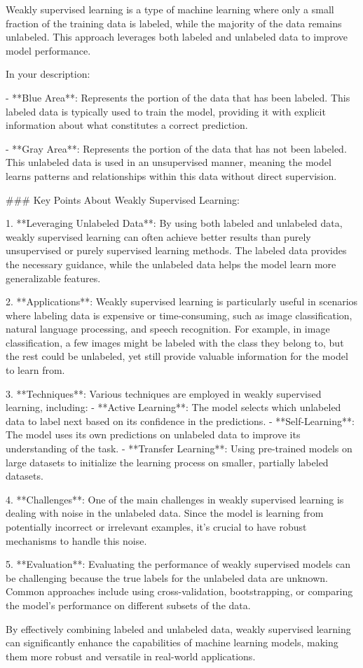 Weakly supervised learning is a type of machine learning where only a small fraction of the training data is labeled, while the majority of the data remains unlabeled. This approach leverages both labeled and unlabeled data to improve model performance.

In your description:

- **Blue Area**: Represents the portion of the data that has been labeled. This labeled data is typically used to train the model, providing it with explicit information about what constitutes a correct prediction.
  
- **Gray Area**: Represents the portion of the data that has not been labeled. This unlabeled data is used in an unsupervised manner, meaning the model learns patterns and relationships within this data without direct supervision.

### Key Points About Weakly Supervised Learning:

1. **Leveraging Unlabeled Data**: By using both labeled and unlabeled data, weakly supervised learning can often achieve better results than purely unsupervised or purely supervised learning methods. The labeled data provides the necessary guidance, while the unlabeled data helps the model learn more generalizable features.

2. **Applications**: Weakly supervised learning is particularly useful in scenarios where labeling data is expensive or time-consuming, such as image classification, natural language processing, and speech recognition. For example, in image classification, a few images might be labeled with the class they belong to, but the rest could be unlabeled, yet still provide valuable information for the model to learn from.

3. **Techniques**: Various techniques are employed in weakly supervised learning, including:
   - **Active Learning**: The model selects which unlabeled data to label next based on its confidence in the predictions.
   - **Self-Learning**: The model uses its own predictions on unlabeled data to improve its understanding of the task.
   - **Transfer Learning**: Using pre-trained models on large datasets to initialize the learning process on smaller, partially labeled datasets.

4. **Challenges**: One of the main challenges in weakly supervised learning is dealing with noise in the unlabeled data. Since the model is learning from potentially incorrect or irrelevant examples, it's crucial to have robust mechanisms to handle this noise.

5. **Evaluation**: Evaluating the performance of weakly supervised models can be challenging because the true labels for the unlabeled data are unknown. Common approaches include using cross-validation, bootstrapping, or comparing the model’s performance on different subsets of the data.

By effectively combining labeled and unlabeled data, weakly supervised learning can significantly enhance the capabilities of machine learning models, making them more robust and versatile in real-world applications.